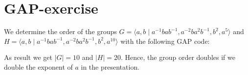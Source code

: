 \section{GAP-exercise}
We determine the order of the groups $G = \langle a, b \mid a^{-1}bab^{-1}, a^{-2}ba^2b^{-1},b^2,a^5 \rangle$ and $H = \langle a, b \mid a^{-1}bab^{-1}, a^{-2}ba^2b^{-1},b^2,a^{10} \rangle$ with the following GAP code:



As result we get $|G| = 10$ and $|H| = 20$. Hence, the group order doubles if we double the exponent of $a$ in the presentation.